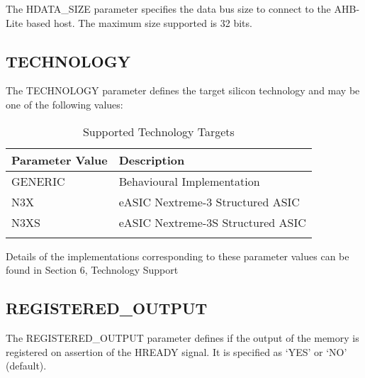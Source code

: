 The HDATA\_SIZE parameter specifies the data bus size to connect to 
the AHB-Lite based host. The maximum size supported is 32 bits.

 \subsection{TECHNOLOGY}\label{technology}

The TECHNOLOGY parameter defines the target silicon technology and 
may be one of the following values:

\begin{longtable}[]{@{}ll@{}}
	\toprule
	Parameter Value & Description\tabularnewline
	\midrule
	\endhead
	GENERIC & Behavioural Implementation\tabularnewline
	N3X & eASIC Nextreme-3 Structured ASIC\tabularnewline
	N3XS & eASIC Nextreme-3S Structured ASIC\tabularnewline
	\bottomrule
	\caption{Supported Technology Targets}
\end{longtable}

Details of the implementations corresponding to these parameter values can be found in Section 6, Technology Support

 \subsection{REGISTERED\_OUTPUT}\label{registered_output}

The REGISTERED\_OUTPUT parameter defines if the output of the memory 
is registered on assertion of the HREADY signal. It is specified as 
`YES' or `NO' (default).